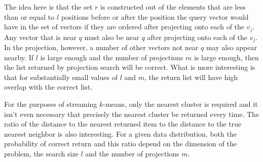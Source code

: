 \documentclass[11pt]{amsart}
\begin{document}
The idea here is that the set $r$ is constructed out of the elements that are less than or equal to $l$ positions before or after the position the query vector would have in the set of vectors if they are ordered after projecting onto each of the $v_j$.  Any vector that is near $q$ must also be near $q$ after projecting onto each of the $v_j$.  In the projection, however, a number of other vectors not near $q$ may also appear nearby.  If $l$ is large enough and the number of projections $m$ is large enough, then the list returned by projection search will be correct.  What is more interesting is that for substantially small values of $l$ and $m$, the return list will have high overlap with the correct list.

For the purposes of streaming $k$-means, only the nearest cluster is required and it isn't even necessary that precisely the nearest cluster be returned every time.  The ratio of the distance to the nearest returned item to the distance to the true nearest neighbor is also interesting.  For a given data distribution, both the probability of correct return and this ratio depend on the dimension of the problem, the search size $l$ and the number of projections $m$.  
\end{document}
